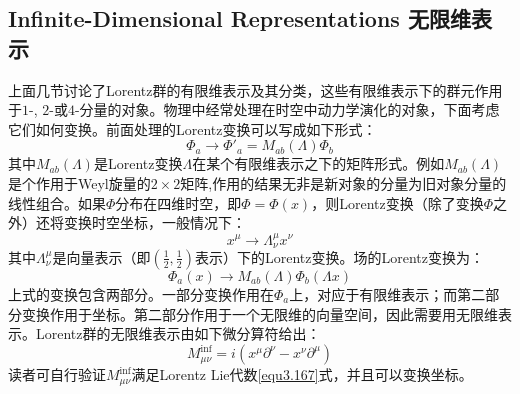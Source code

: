 \subsection[无限维表示]{Infinite-Dimensional Representations \quad 无限维表示}
\label{sec3.7.11}
上面几节讨论了Lorentz群的有限维表示及其分类，这些有限维表示下的群元作用于$1$-, $2$-或$4$-分量的对象。物理中经常处理在时空中动力学演化的对象，下面考虑它们如何变换。前面处理的Lorentz变换可以写成如下形式：
\begin{equation}
\label{equ3.237}
    \Phi_a \rightarrow \Phi'_a = M_{ab}(\Lambda) \Phi_b
\end{equation}
其中$M_{ab} (\Lambda)$是Lorentz变换$\Lambda$在某个有限维表示之下的矩阵形式。例如$M_{ab} (\Lambda)$是个作用于Weyl旋量的$2 \times 2$矩阵,作用的结果无非是新对象的分量为旧对象分量的线性组合。如果$\Phi$分布在四维时空，即$\Phi = \Phi({x})$，则Lorentz变换（除了变换$\Phi$之外）还将变换时空坐标，一般情况下：
\begin{equation}
\label{equ3.238}
    x^\mu \rightarrow \Lambda^\mu_\nu x^\nu
\end{equation}
其中$\Lambda^\mu_\nu$是向量表示（即$(\frac{1}{2}, \frac{1}{2})$表示）下的Lorentz变换。场的Lorentz变换为：
\begin{equation}
\label{equ3.239}
    \Phi_a ({x})  \rightarrow M_{ab} (\Lambda) \Phi_b (\Lambda {x})
\end{equation}
上式的变换包含两部分。一部分变换作用在$\Phi_a$上，对应于有限维表示；而第二部分变换作用于坐标。第二部分作用于一个无限维的向量空间，因此需要用无限维表示。Lorentz群的无限维表示由如下微分算符给出：
\begin{equation}
\label{equ3.240}
    M^{\mathrm{inf}}_{\mu \nu} = i (x^\mu \partial^\nu - x^\nu \partial^\mu)
\end{equation}
读者可自行验证$M^{\mathrm{inf}}_{\mu \nu}$满足Lorentz Lie代数\eqref{equ3.167}式，并且可以变换坐标。

